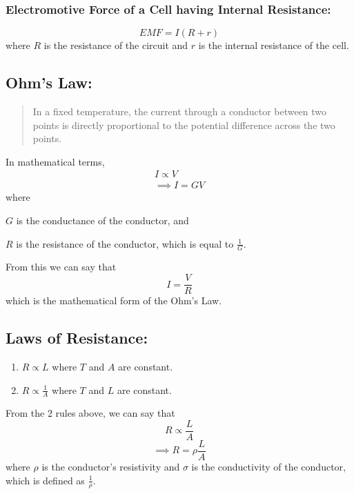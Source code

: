 \documentclass[a4paper]{report}
\begin{document}
            \subsubsection{Electromotive Force of a Cell having Internal Resistance:}
                \begin{equation}
                    EMF = I(R + r)
                \end{equation}
                where $R$ is the resistance of the circuit and $r$ is the internal resistance of the cell.
        \subsection{Ohm's Law:}
            \begin{quotation}
                In a fixed temperature, the current through a conductor between two points is directly proportional to the potential difference across the two points.
            \end{quotation}
            In mathematical terms,
            \begin{align*}
                I \propto V \\
                \implies I = GV 
            \end{align*}
            where
            \begin{description}
                \item $G$ is the conductance of the conductor, and
                \item $R$ is the resistance of the conductor, which is equal to $\frac{1}{G}$. 
            \end{description}
            From this we can say that
            \begin{equation}
                I = \frac{V}{R}
            \end{equation}
            which is the mathematical form of the Ohm's Law.
        \subsection{Laws of Resistance:}
            \begin{enumerate}
                \item $R \propto L$ where $T$ and $A$ are constant.
                \item $R \propto \frac{1}{A}$ where $T$ and $L$ are constant.
            \end{enumerate}
            From the 2 rules above, we can say that
            \begin{equation*}
                R \propto \frac{L}{A}
            \end{equation*}
            \begin{equation}
                \implies R = \rho \frac{L}{A}
            \end{equation}
            where $\rho$ is the conductor's resistivity and $\sigma$ is the conductivity of the conductor, which is defined as $\frac{1}{\rho}$.
\end{document}
